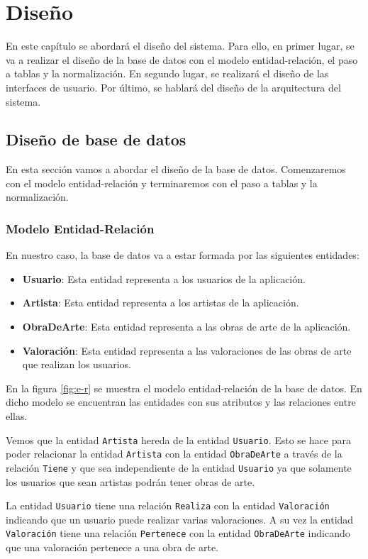 \chapter{Diseño}
En este capítulo se abordará el diseño del sistema. Para ello, en primer
lugar, se va a realizar el diseño de la base de datos con el modelo
entidad-relación, el paso a tablas y la normalización. En segundo lugar,
se realizará el diseño de las interfaces de usuario. Por último, se
hablará del diseño de la arquitectura del sistema.

\section{Diseño de base de datos}
En esta sección vamos a abordar el diseño de la base de datos.
\mbox{Comenzaremos} con el modelo entidad-relación y terminaremos con el paso a
tablas y la normalización.

\subsection{Modelo Entidad-Relación}
En nuestro caso, la base de datos va a estar formada por las siguientes
entidades:

\begin{itemize}
    \item \textbf{Usuario}: Esta entidad representa a los usuarios de la aplicación.
    \item \textbf{Artista}: Esta entidad representa a los artistas de la aplicación.
    \item \textbf{ObraDeArte}: Esta entidad representa a las obras de arte de la aplicación.
    \item \textbf{Valoración}: Esta entidad representa a las valoraciones de las obras de
    arte que realizan los usuarios.
\end{itemize}

En la figura \ref{fig:e-r} se muestra el modelo entidad-relación de la base de
datos. En dicho modelo se encuentran las entidades con sus atributos y las
relaciones entre ellas.

Vemos que la entidad \texttt{Artista} hereda de la entidad \texttt{Usuario}.
Esto se hace para poder relacionar la entidad \texttt{Artista} con la entidad
\texttt{ObraDeArte} a través de la relación \texttt{Tiene} y que sea independiente
de la entidad \texttt{Usuario} ya que solamente los usuarios que sean artistas
podrán tener obras de arte.

La entidad \texttt{Usuario} tiene una relación \texttt{Realiza} con la entidad
\texttt{Valoración} indicando que un usuario puede realizar varias valoraciones.
A su vez la entidad \texttt{Valoración} tiene una relación \texttt{Pertenece} con
la entidad \texttt{ObraDeArte} indicando que una valoración pertenece a una obra
de arte.

